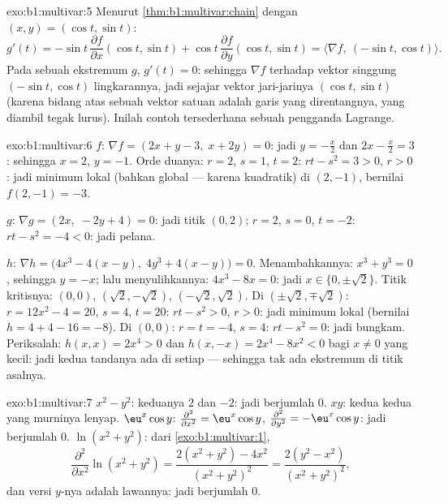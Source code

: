 \begin{solution}{exo:b1:multivar:5}
Menurut \cref{thm:b1:multivar:chain} dengan $(x, y) = (\cos t, \sin t)$:
\[
g'(t) = -\sin t\,\frac{\partial f}{\partial x}(\cos t, \sin t)
+ \cos t\,\frac{\partial f}{\partial y}(\cos t, \sin t)
= \bigl\langle \nabla f,\ (-\sin t, \cos t)\bigr\rangle .
\]
Pada sebuah ekstremum $g$, $g'(t) = 0$: sehingga $\nabla f$  terhadap
vektor singgung $(-\sin t, \cos t)$ lingkarannya, jadi sejajar
vektor jari-jarinya $(\cos t, \sin t)$ (karena 
bidang atas sebuah vektor satuan adalah garis yang direntangnya, yang diambil
tegak lurus). Inilah contoh tersederhana sebuah pengganda
Lagrange.
\end{solution}

\begin{solution}{exo:b1:multivar:6}
$f$: $\nabla f = (2x + y - 3,\; x + 2y) = 0$: jadi $y = -\frac x2$ dan
$2x - \frac x2 = 3$: sehingga $x = 2$, $y = -1$. Orde duanya: $r = 2$, $s =
1$, $t = 2$: $rt - s^2 = 3 > 0$, $r > 0$: jadi minimum lokal (bahkan global ---
karena kuadratik) di $(2, -1)$, bernilai $f(2,-1) = -3$.

$g$: $\nabla g = (2x,\; -2y + 4) = 0$: jadi titik $(0, 2)$; $r = 2$, $s
= 0$, $t = -2$: $rt - s^2 = -4 < 0$: jadi pelana.

$h$: $\nabla h = \bigl(4x^3 - 4(x - y),\; 4y^3 + 4(x-y)\bigr) = 0$.
Menambahkannya: $x^3 + y^3 = 0$, sehingga $y = -x$; lalu menyulihkannya: $4x^3 - 8x = 0$:
jadi $x \in \{0, \pm\sqrt2\}$. Titik kritisnya: $(0,0)$,
$(\sqrt2, -\sqrt2)$, $(-\sqrt2, \sqrt2)$.
Di $(\pm\sqrt2, \mp\sqrt2)$: $r = 12x^2 - 4 = 20$, $s = 4$, $t =
20$: $rt - s^2 > 0$, $r > 0$: jadi minimum lokal (bernilai $h = 4 + 4 - 16 =
-8$). Di $(0,0)$: $r = t = -4$, $s = 4$: $rt - s^2 = 0$: jadi bungkam.
Periksalah: $h(x, x) = 2x^4 > 0$ dan $h(x, -x) = 2x^4 - 8x^2 < 0$ bagi
$x \neq 0$ yang kecil: jadi kedua tandanya ada di setiap  --- sehingga tak ada
ekstremum di titik asalnya.
\end{solution}

\begin{solution}{exo:b1:multivar:7}
$x^2 - y^2$:  keduanya $2$ dan $-2$: jadi berjumlah $0$. $xy$: kedua
 kedua yang murninya lenyap. $\eu^x\cos y$: $\frac{\partial^2}{\partial
x^2} = \eu^x\cos y$, $\frac{\partial^2}{\partial y^2} =
-\eu^x\cos y$: jadi berjumlah $0$. $\ln(x^2+y^2)$: dari
\cref{exo:b1:multivar:1},
\[
\frac{\partial^2}{\partial x^2}\ln(x^2+y^2)
= \frac{2(x^2+y^2) - 4x^2}{(x^2+y^2)^2}
= \frac{2(y^2 - x^2)}{(x^2+y^2)^2},
\]
dan versi $y$-nya adalah lawannya: jadi berjumlah $0$.
\end{solution}

